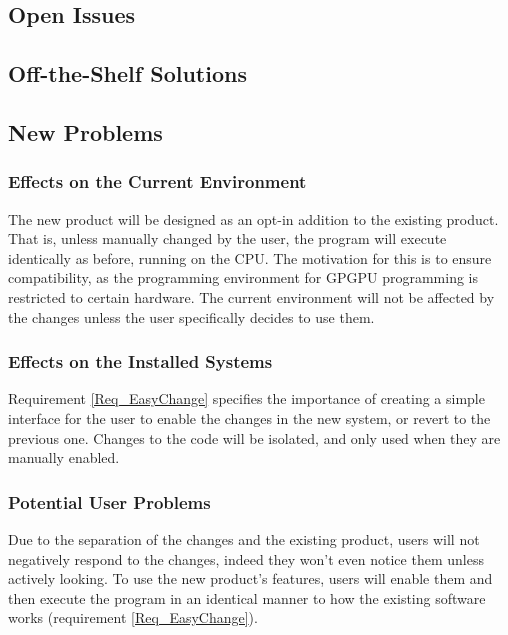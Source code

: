 \documentclass[12pt]{article}
\begin{document}
\subsection{Open Issues} %

\subsection{Off-the-Shelf Solutions} %

\subsection{New Problems} %
\subsubsection{Effects on the Current Environment}
The new product will be designed as an opt-in addition to the existing product. That is, unless manually changed by the user, the program will execute identically as before, running on the CPU. The motivation for this is to ensure compatibility, as the programming environment for GPGPU programming is restricted to certain hardware. The current environment will not be affected by the changes unless the user specifically decides to use them.

\subsubsection{Effects on the Installed Systems}
Requirement \ref{Req_EasyChange} specifies the importance of creating a simple interface for the user to enable the changes in the new system, or revert to the previous one. Changes to the code will be isolated, and only used when they are manually enabled.

\subsubsection{Potential User Problems}
Due to the separation of the changes and the existing product, users will not negatively respond to the changes, indeed they won't even notice them unless actively looking. To use the new product's features, users will enable them and then execute the program in an identical manner to how the existing software works (requirement \ref{Req_EasyChange}).
\end{document}
